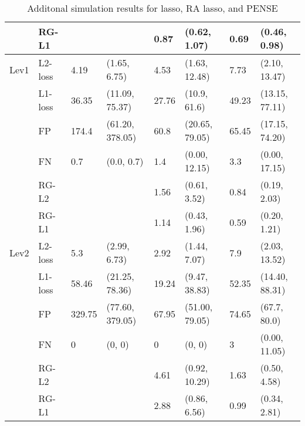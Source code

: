 \begin{table}[]
\begin{tabular}{llllllll}
       & RG-L1   &        &               & 0.87     & (0.62, 1.07)     & 0.69  & (0.46, 0.98)     \\ \hline
Lev1   & L2-loss & 4.19   & (1.65, 6.75)     & 4.53     & (1.63, 12.48)    & 7.73  & (2.10, 13.47)    \\
       & L1-loss & 36.35  & (11.09, 75.37)   & 27.76    & (10.9, 61.6)     & 49.23 & (13.15, 77.11)   \\
       & FP      & 174.4  & (61.20, 378.05)  & 60.8     & (20.65, 79.05)   & 65.45 & (17.15, 74.20)   \\
       & FN      & 0.7    & (0.0, 0.7)       & 1.4      & (0.00, 12.15)    & 3.3   & (0.00, 17.15)    \\
       & RG-L2   &        &               & 1.56     & (0.61, 3.52)     & 0.84  & (0.19, 2.03)     \\
       & RG-L1   &        &               & 1.14     & (0.43, 1.96)     & 0.59  & (0.20, 1.21)     \\ \hline
Lev2   & L2-loss & 5.3    & (2.99, 6.73)     & 2.92     & (1.44, 7.07)     & 7.9   & (2.03, 13.52)    \\
       & L1-loss & 58.46  & (21.25, 78.36)   & 19.24    & (9.47, 38.83)    & 52.35 & (14.40, 88.31)   \\
       & FP      & 329.75 & (77.60, 379.05)  & 67.95    & (51.00, 79.05)   & 74.65 & (67.7, 80.0)     \\
       & FN      & 0      & (0, 0)           & 0        & (0, 0)           & 3     & (0.00, 11.05)    \\
       & RG-L2   &        &               & 4.61     & (0.92, 10.29)    & 1.63  & (0.50, 4.58)     \\
       & RG-L1   &        &               & 2.88     & (0.86, 6.56)     & 0.99  & (0.34, 2.81)    
\end{tabular}
\caption{Additonal simulation results for lasso, RA lasso, and PENSE}\label{tab:revised}
\end{table}